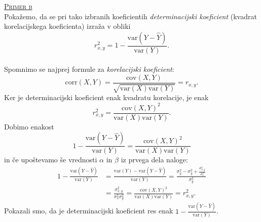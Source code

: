 \documentclass[a4paper,12pt]{article}
\begin{document}
\noindent
\textsc{\underline{Primer b}}
\\
Pokažemo, da se pri tako izbranih koeficientih \textit{determinacijski koeficient} (kvadrat korelacijskega koeficienta) izraža v obliki
$$ r_{x,y}^2 = 1 - \frac{\text{var}(Y - \hat{Y})}{\text{var}(Y)}. $$
\\
Spomnimo se najprej formule za \textit{korelacijski koeficient}: 
$$ \text{corr}(X,Y) = \frac{\text{cov}(X,Y)}{\sqrt{\text{var}(X) \text{var}(Y)}} = r_{x,y}. $$
Ker je determinacijski koeficient enak kvadratu korelacije, je enak
$$ r_{x,y}^2 = \frac{\text{cov}(X,Y)^2}{\text{var}(X) \text{var}(Y)}. $$
Dobimo enakost
$$ 1 - \frac{\text{var}(Y - \hat{Y})}{\text{var}(Y)} = \frac{\text{cov}(X,Y)^2}{\text{var}(X) \text{var}(Y)} $$
in če upoštevamo še vrednosti $\alpha$ in $\beta$ iz prvega dela naloge:
\begin{align*} 
    1 - \frac{\text{var}(Y - \hat{Y})}{\text{var}(Y)} &= \frac{\text{var}(Y) - \text{var}(Y - \hat{Y})}{\text{var}(Y)} = \frac{\sigma_y^2 - \sigma_y^2 + \frac{\sigma_{x,y}^2}{\sigma_x^2}}{\sigma_y^2} 
    \\
    &= \frac{\sigma_{x,y}^2}{\sigma_x^2 \sigma_y^2} = \frac{\text{cov}(X,Y)^2}{\text{var}(X) \text{var}(Y)} = r_{x,y}^2. 
\end{align*}
Pokazali smo, da je determinacijski koeficient res enak $1 - \frac{\text{var}(Y - \hat{Y})}{\text{var}(Y)}$.
\end{document}
